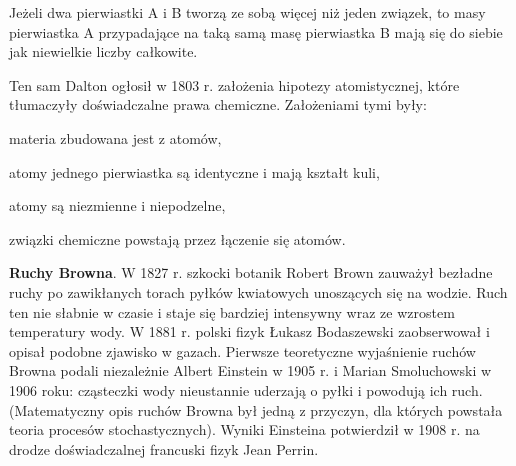 \begin{theorem}
Jeżeli dwa pierwiastki A i B tworzą ze sobą więcej niż jeden związek, to masy pierwiastka A przypadające na taką samą masę pierwiastka B mają się do siebie jak niewielkie liczby całkowite.
\end{theorem}

Ten sam Dalton ogłosił w 1803 r. założenia hipotezy atomistycznej, które tłumaczyły doświadczalne prawa chemiczne.
Założeniami tymi były:
\begin{compactitem}
	\item materia zbudowana jest z atomów, 
	\item atomy jednego pierwiastka są identyczne i mają kształt kuli,
	\item atomy są niezmienne i niepodzelne,
	\item związki chemiczne powstają przez łączenie się atomów.
\end{compactitem}


\textbf{Ruchy Browna}.
W 1827 r. szkocki botanik Robert Brown zauważył bezładne ruchy po zawikłanych torach pyłków kwiatowych unoszących się na wodzie.
Ruch ten nie słabnie w czasie i staje się bardziej intensywny wraz ze wzrostem temperatury wody.
%
W 1881 r. polski fizyk Łukasz Bodaszewski zaobserwował i opisał podobne zjawisko w gazach.
%
Pierwsze teoretyczne wyjaśnienie ruchów Browna podali niezależnie Albert Einstein w 1905 r. i Marian Smoluchowski w 1906 roku: cząsteczki wody nieustannie uderzają o pyłki i powodują ich ruch.
(Matematyczny opis ruchów Browna był jedną z przyczyn, dla których powstała teoria procesów stochastycznych).
%
%
Wyniki Einsteina potwierdził w 1908 r. na drodze doświadczalnej francuski fizyk Jean Perrin.
%

